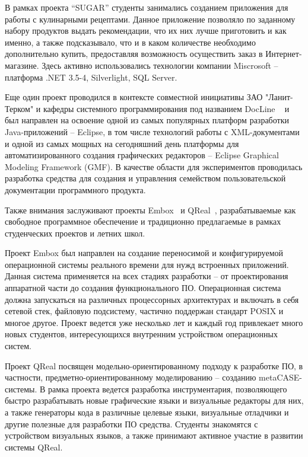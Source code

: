 \documentclass[a5paper]{article}
\begin{document}
В рамках проекта ``SUGAR'' студенты занимались созданием приложения для работы с кулинарными рецептами. Данное приложение позволяло по заданному набору продуктов выдать рекомендации, что их них лучше приготовить и как именно, а также подсказывало, что и в каком количестве необходимо дополнительно купить, предоставляя возможность осуществить заказ в Интернет-магазине. Здесь активно использовались технологии компании Miscrosoft -- платформа .NET 3.5-4, Silverlight, SQL Server.

Еще один проект проводился в контексте совместной инициативы ЗАО "Ланит-Терком" и кафедры системного программирования под названием DocLine ~\cite{docLine1, docLine2, docLine3} и был направлен на освоение одной из самых популярных платформ разработки Java-приложений -- Eclipse, в том числе технологий работы с XML-документами и одной из самых мощных на сегодняшний день платформы для автоматизированного создания графических редакторов -- Eclipse Graphical Modeling Framework (GMF). В качестве области для экспериментов проводилась разработка средства для создания и управления семейством пользовательской документации программного продукта. 
 
Также внимания заслуживают проекты Embox~\cite{embox} и QReal~\cite{qreal2,qreal}, разрабатываемые как свободное программное обеспечение и традиционно предлагаемые в рамках студенческих проектов и летних школ. 

Проект Embox был направлен на создание переносимой  и конфигурируемой операционной системы реального времени для нужд встроенных приложений. Данная система применяется на всех стадиях разработки -- от проектирования аппаратной части до создания функционального ПО. Операционная система  должна запускаться на различных процессорных архитектурах и включать в себя сетевой стек, файловую подсистему, частично поддержан стандарт POSIX и многое другое. Проект ведется уже несколько лет и каждый год привлекает много новых студентов, интересующихся внутренним устройством операционных систем.  

Проект QReal посвящен модельно-ориентированному подходу к разработке ПО, в частности, предметно-ориентированному моделированию -- созданию metaCASE-системы. В рамка проекта ведется разработка инструментария, позволяющего быстро разрабатывать новые графические языки и визуальные редакторы для них, а также генераторы кода в различные целевые языки, визуальные отладчики и другие полезные для разработки ПО средства. Студенты знакомятся с устройством визуальных языков, а также принимают активное участие в развитии системы QReal.
\end{document}
